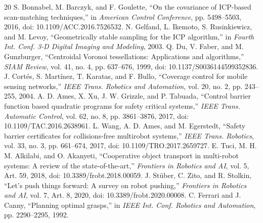 \begin{thebibliography}{20}
 S. Bonnabel, M. Barczyk, and F. Goulette, ``On the covariance of ICP-based scan-matching techniques,'' in \emph{American Control Conference}, pp. 5498--5503, 2016, doi: 10.1109/ACC.2016.7526532.
 N. Gelfand, L. Ikemoto, S. Rusinkiewicz, and M. Levoy, ``Geometrically stable sampling for the ICP algorithm,'' in \emph{Fourth Int. Conf. 3-D Digital Imaging and Modeling}, 2003.
 Q. Du, V. Faber, and M. Gunzburger, ``Centroidal Voronoi tessellations: Applications and algorithms,'' \emph{SIAM Review}, vol. 41, no. 4, pp. 637--676, 1999, doi: 10.1137/S0036144599352836.
 J. Cort{\'e}s, S. Mart{\'i}nez, T. Karatas, and F. Bullo, ``Coverage control for mobile sensing networks,'' \emph{IEEE Trans. Robotics and Automation}, vol. 20, no. 2, pp. 243--255, 2004.
 A. D. Ames, X. Xu, J. W. Grizzle, and P. Tabuada, ``Control barrier function based quadratic programs for safety critical systems,'' \emph{IEEE Trans. Automatic Control}, vol. 62, no. 8, pp. 3861--3876, 2017, doi: 10.1109/TAC.2016.2638961.
 L. Wang, A. D. Ames, and M. Egerstedt, ``Safety barrier certificates for collisions-free multirobot systems,'' \emph{IEEE Trans. Robotics}, vol. 33, no. 3, pp. 661--674, 2017, doi: 10.1109/TRO.2017.2659727.
 E. Tuci, M. H. M. Alkilabi, and O. Akanyeti, ``Cooperative object transport in multi-robot systems: A review of the state-of-the-art,'' \emph{Frontiers in Robotics and AI}, vol. 5, Art. 59, 2018, doi: 10.3389/frobt.2018.00059.
 J. St{\"u}ber, C. Zito, and R. Stolkin, ``Let's push things forward: A survey on robot pushing,'' \emph{Frontiers in Robotics and AI}, vol. 7, Art. 8, 2020, doi: 10.3389/frobt.2020.00008.
 C. Ferrari and J. Canny, ``Planning optimal grasps,'' in \emph{IEEE Int. Conf. Robotics and Automation}, pp. 2290--2295, 1992.
\end{thebibliography}
